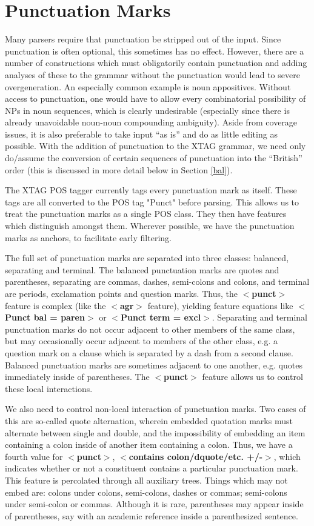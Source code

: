 
\chapter{Punctuation Marks}
\label{punct-chapt}

Many parsers require that punctuation be stripped out of the
input. Since punctuation is often optional, this sometimes has no
effect. However, there are a number of constructions which must
obligatorily contain punctuation and adding analyses of these to the
grammar without the punctuation would lead to severe
overgeneration. An especially common example is noun
appositives. Without access to punctuation, one would have to allow
every combinatorial possibility of NPs in noun sequences, which is
clearly undesirable (especially since there is already unavoidable
noun-noun compounding ambiguity). Aside from coverage issues, it is
also preferable to take input ``as is'' and do as little editing as
possible. With the addition of punctuation to the XTAG grammar, we
need only do/assume the conversion of certain sequences of punctuation
into the ``British'' order (this is discussed in more detail below in
Section \ref{bal}).

The XTAG POS tagger currently tags every punctuation mark as
itself. These tags are all converted to the POS tag "Punct" before
parsing. This allows us to treat the punctuation marks as a single POS
class. They then have features which distinguish amongst them.
Wherever possible, we have the punctuation marks as anchors, to
facilitate early filtering.

The full set of punctuation marks are separated into three classes:
balanced, separating and terminal. The balanced punctuation marks are
quotes and parentheses, separating are commas, dashes, semi-colons and
colons, and terminal are periods, exclamation points and question
marks. Thus, the {\bf $<$punct$>$} feature is complex (like the {\bf
$<$agr$>$} feature), yielding feature equations like {\bf $<$Punct bal
= paren$>$} or {\bf $<$Punct term = excl$>$}. Separating and terminal
punctuation marks do not occur adjacent to other members of the same
class, but may occasionally occur adjacent to members of the other
class, e.g. a question mark on a clause which is separated by a dash
from a second clause. Balanced punctuation marks are sometimes adjacent
to one another, e.g. quotes immediately inside of parentheses. The
{\bf $<$punct$>$} feature allows us to control these local
interactions.

We also need to control non-local interaction of punctuation
marks. Two cases of this are so-called quote alternation, wherein
embedded quotation marks must alternate between single and double, and
the impossibility of embedding an item containing a colon inside of
another item containing a colon. Thus, we have a fourth value for {\bf
$<$punct$>$}, {\bf $<$contains colon/dquote/etc. +/-$>$}, which
indicates whether or not a constituent contains a particular
punctuation mark. This feature is percolated through all auxiliary
trees.  Things which may not embed are: colons under colons,
semi-colons, dashes or commas; semi-colons under semi-colon or commas.
Although it is rare, parentheses may appear inside of parentheses, say
with an academic reference inside a parenthesized sentence.
 
